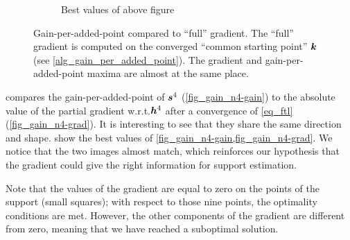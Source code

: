 \begin{figure}[!h]
\begin{subfigure}[b]{0.34\linewidth}
	\caption{Best values of above figure}\label{fig_gain_n4-grad_best}
	\end{subfigure}
\caption{Gain-per-added-point compared to “full” gradient. The “full” gradient is computed on the converged “common starting point” $\bm{k}$ (see \cref{alg_gain_per_added_point}). The gradient and gain-per-added-point maxima are almost at the same place. }\label{fig_gain_n4}
\end{figure}

\noindent
{} compares the gain-per-added-point of $\bm{s}^4$ (\cref{fig_gain_n4-gain}) to the absolute value of the partial gradient w.r.t.\@ $\bm{h}^4$ after a convergence of \eqref{eq_ftl} (\cref{fig_gain_n4-grad}). It is interesting to see that they share the same direction and shape.  show the best values of \cref{fig_gain_n4-gain,fig_gain_n4-grad}. We notice that the two images almost match, which reinforces our hypothesis that the gradient could give the right information for support estimation.

\noindent
Note that the values of the gradient are equal to zero on the points of the support (small squares); with respect to those nine points, the optimality conditions are met. However, the other components of the gradient are different from zero, meaning that we have reached a suboptimal solution.

